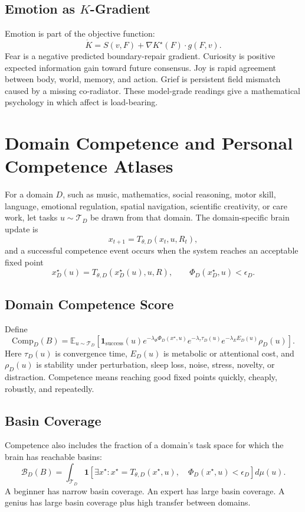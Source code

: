 \documentclass[11pt]{article}
\theoremstyle{remark}
\theoremstyle{plain}
\newcommand{\E}{\mathbb E}
\begin{document}
\subsection[Emotion as K-Gradient]{Emotion as \(K\)-Gradient}

Emotion is part of the objective function:
\[
\dot K
=
S(v,F)+\nabla K^\star(F)\cdot g(F,v).
\]
Fear is a negative predicted boundary-repair gradient. Curiosity is positive expected information gain toward future consensus. Joy is rapid agreement between body, world, memory, and action. Grief is persistent field mismatch caused by a missing co-radiator. These model-grade readings give a mathematical psychology in which affect is load-bearing.

\section{Domain Competence and Personal Competence Atlases}

For a domain \(D\), such as music, mathematics, social reasoning, motor skill, language, emotional regulation, spatial navigation, scientific creativity, or care work, let tasks \(u\sim\mathcal T_D\) be drawn from that domain. The domain-specific brain update is
\[
x_{t+1}=T_{\theta,D}(x_t,u,R_t),
\]
and a successful competence event occurs when the system reaches an acceptable fixed point
\[
x^\star_D(u)=T_{\theta,D}(x^\star_D(u),u,R),
\qquad
\Phi_D(x^\star_D,u)<\epsilon_D.
\]

\subsection{Domain Competence Score}

Define
\[
\boxed{
\mathrm{Comp}_D(B)
=
\E_{u\sim\mathcal T_D}
\left[
\mathbf 1_{\mathrm{success}}(u)
e^{-\lambda_\Phi \Phi_D(x^\star,u)}
e^{-\lambda_\tau \tau_D(u)}
e^{-\lambda_E E_D(u)}
\rho_D(u)
\right].
}
\]
Here \(\tau_D(u)\) is convergence time, \(E_D(u)\) is metabolic or attentional cost, and \(\rho_D(u)\) is stability under perturbation, sleep loss, noise, stress, novelty, or distraction. Competence means reaching good fixed points quickly, cheaply, robustly, and repeatedly.

\subsection{Basin Coverage}

Competence also includes the fraction of a domain's task space for which the brain has reachable basins:
\[
\boxed{
\mathcal B_D(B)
=
\int_{\mathcal T_D}
\mathbf 1
\left[
\exists x^\star:
x^\star=T_{\theta,D}(x^\star,u),\quad
\Phi_D(x^\star,u)<\epsilon_D
\right]
d\mu(u).
}
\]
A beginner has narrow basin coverage. An expert has large basin coverage. A genius has large basin coverage plus high transfer between domains.
\end{document}
